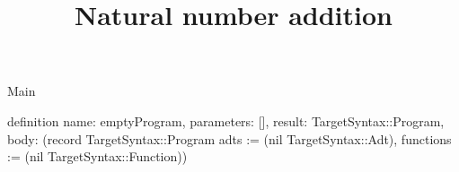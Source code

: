 \begin{lexlean}{Main}
\title{Natural number addition}
\begin{semanticmodule}
definition{
  name: emptyProgram,
  parameters: [],
  result: TargetSyntax::Program,
  body: (record TargetSyntax::Program {adts := (nil TargetSyntax::Adt), functions := (nil TargetSyntax::Function)})
}
\end{semanticmodule}
\end{lexlean}
